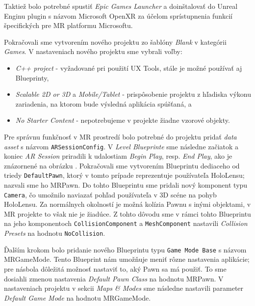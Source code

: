 Taktiež bolo potrebné spustiť \emph{Epic Games Launcher} a doinštalovať do Unreal Enginu plugin s názvom Microsoft OpenXR za účelom sprístupnenia funkcií špecifických pre MR platformu Microsoftu.

Pokračovali sme vytvorením nového projektu zo šablóny \emph{Blank} v kategórii \emph{Games}. V nastaveniach nového projektu sme vybrali voľby:
\begin{itemize}
  \item \emph{C++ project} - vyžadované pri použití UX Tools, stále je možné používať aj Blueprinty,
  \item \emph{Scalable 2D or 3D} a \emph{Mobile/Tablet} - prispôsobenie projektu z hľadiska výkonu zariadenia, na ktorom bude výsledná aplikácia spúšťaná, a
  \item \emph{No Starter Content} - nepotrebujeme v projekte žiadne vzorové objekty.
\end{itemize}

Pre správnu funkčnosť v MR prostredí bolo potrebné do projektu pridať \emph{data asset} s názvom \texttt{ARSessionConfig}. V \emph{Level Blueprinte} sme následne začiatok a koniec \emph{AR Session}
priradili k udalostiam \emph{Begin Play}, resp. \emph{End Play}, ako je znázornené na obrázku .
Pokračovali sme vytvorením Blueprintu dediaceho od triedy \texttt{DefaultPawn}, ktorý v tomto prípade reprezentuje používateľa HoloLensu; nazvali sme ho MRPawn.
Do tohto Blueprintu sme pridali nový komponent typu
\texttt{Camera}, čo umožnilo naviazať pohľad používateľa v 3D scéne na pohyb HoloLensu. Za normálnych okolností je možná kolízia Pawnu s inými objektami, v MR projekte to však nie je žiadúce.
Z tohto dôvodu sme v rámci tohto Blueprintu na jeho komponentoch \texttt{CollisionComponent} a \texttt{MeshComponent} nastavili \emph{Collision Presets} na hodnotu \texttt{NoCollision}. 

Ďalším krokom bolo pridanie nového Blueprintu typu \texttt{Game Mode Base} s názvom MRGameMode. Tento Blueprint nám umožňuje meniť rôzne nastavenia aplikácie; pre násbola dôležitá možnosť nastaviť 
to, aký Pawn sa má použiť. To sme dosiahli zmenou nastavenia \emph{Default Pawn Class} na hodnotu MRPawn. V nastaveniach projektu v sekcii \emph{Maps \& Modes} sme následne nastavili parameter
\emph{Default Game Mode} na hodnotu MRGameMode.